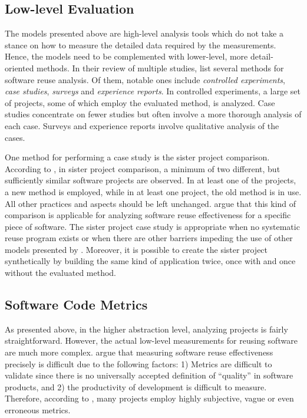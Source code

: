 \subsection{Low-level Evaluation}

The models presented above are high-level analysis tools which do not take a stance on how to measure the detailed data required by the measurements. Hence, the models need to be complemented with lower-level, more detail-oriented methods. In their review of multiple studies, \citet{mohagheghi_quality_2007} list several methods for software reuse analysis. Of them, notable ones include \emph{controlled experiments}, \emph{case studies}, \emph{surveys} and \emph{experience reports}. In controlled experiments, a large set of projects, some of which employ the evaluated method, is analyzed. Case studies concentrate on fewer studies but often involve a more thorough analysis of each case. Surveys and experience reports involve qualitative analysis of the cases. 

One method for performing a case study is the sister project comparison. According to \citet{kitchenham_evaluating_1998}, in sister project comparison, a minimum of two different, but sufficiently similar software projects are observed. In at least one of the projects, a new method is employed, while in at least one project, the old method is in use. All other practices and aspects should be left unchanged. \citet{mohagheghi_quality_2007} argue that this kind of comparison is applicable for analyzing software reuse effectiveness for a specific piece of software. The sister project case study is appropriate when no systematic reuse program exists or when there are other barriers impeding the use of other models presented by \citet{mohagheghi_quality_2007}. Moreover, it is possible to create the sister project synthetically by building the same kind of application twice, once with and once without the evaluated method.

\subsection{Software Code Metrics}

As presented above, in the higher abstraction level, analyzing projects is fairly straightforward. However, the actual low-level measurements for reusing software are much more complex. \citet{mohagheghi_quality_2007} argue that measuring software reuse effectiveness precisely is difficult due to the following factors: 1) Metrics are difficult to validate since there is no universally accepted definition of ``quality'' in software products, and 2) the productivity of development is difficult to measure. Therefore, according to \citet{mohagheghi_quality_2007}, many projects employ highly subjective, vague or even erroneous metrics.


